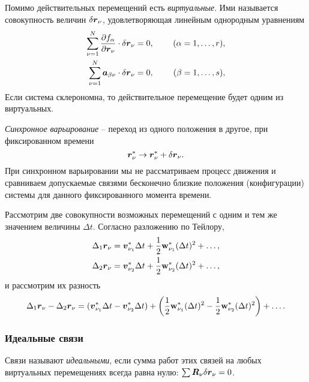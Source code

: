 Помимо действительных перемещений есть \textit{виртуальные}. Ими называется совокупность величин $\delta \mbox{\boldmath $r$}_\nu$, удовлетворяющая линейным однородным уравнениям
\begin{align}
\label{eqs12}
    \sum_{\nu=1}^N \frac{\partial f_\alpha}{\partial \mbox{\boldmath $r$}_\nu} \cdot \delta \mbox{\boldmath $r$}_\nu  &= 0,
    \hspace{0.5cm} &(\alpha = 1, \ldots, r), \\
\label{eqs13}
    \sum_{\nu=1}^N \mbox{\boldmath $a$}_{\beta\nu} \cdot \delta \mbox{\boldmath $r$}_\nu  &= 0,
    \hspace{0.5cm} &(\beta = 1, \ldots, s),
\end{align}
Если система склерономна, то действительное перемещение будет одним из виртуальных.

\begin{to_def} 
    \textit{Синхронное варьирование} -- переход из одного положения в другое, при фиксированном времени
    $$
        \mbox{\boldmath $r$}_\nu^* \to \mbox{\boldmath $r$}_\nu^* + \delta \mbox{\boldmath $r$}_\nu.
    $$
    При синхронном варьировании мы не рассматриваем процесс движения и сравниваем допускаемые связями
    бесконечно близкие положения (конфигурации) системы для данного фиксированного момента времени.
\end{to_def}

Рассмотрим две совокупности возможных перемещений с одним и тем же значением величины $\Delta t$. Согласно разложению по Тейлору,
\begin{align*}
    \Delta_1 \mbox{\boldmath $r$}_\nu = \mbox{\boldmath $v$}_{\nu_1}^* \Delta t + \frac{1}{2} \mbox{\boldmath $\mathrm{w}$}_{\nu_1}^* (\Delta t)^2 + \ldots, \\
    \Delta_2 \mbox{\boldmath $r$}_\nu = \mbox{\boldmath $v$}_{\nu_2}^* \Delta t + \frac{1}{2} \mbox{\boldmath $\mathrm{w}$}_{\nu_2}^* (\Delta t)^2 + \ldots, 
\end{align*}
и рассмотрим их разность
$$
        \Delta_1 \mbox{\boldmath $r$}_\nu - \Delta_2 \mbox{\boldmath $r$}_\nu = (\mbox{\boldmath $v$}_{\nu_1}^* \Delta t - \mbox{\boldmath $v$}_{\nu_2}^* \Delta t) + \left(\frac{1}{2} \mbox{\boldmath $\mathrm{w}$}_{\nu_1}^* (\Delta t)^2 - \frac{1}{2} \mbox{\boldmath $\mathrm{w}$}_{\nu_2}^* (\Delta t)^2\right) + \ldots.
$$

\subsubsection*{Идеальные связи}
\begin{to_def}
	Связи называют \textit{идеальными}, если сумма работ этих связей на любых виртуальных перемещениях всегда равна нулю: $\sum \mbox{\boldmath $R$}_\nu \delta \mbox{\boldmath $r$}_\nu = 0$.
\end{to_def}

